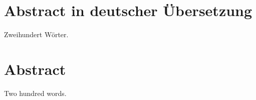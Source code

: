 
\chapter*{Abstract in deutscher \"{U}bersetzung}

Zweihundert W\"orter.


\chapter*{Abstract}

Two hundred words.
